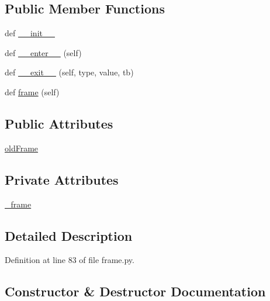 \subsection*{Public Member Functions}
\begin{DoxyCompactItemize}
\item 
def \hyperlink{classmemoryoracle_1_1frame_1_1Selector_a4321284dd9eaf92a17e1cab0b05031aa}{\+\_\+\+\_\+init\+\_\+\+\_\+}
\item 
def \hyperlink{classmemoryoracle_1_1frame_1_1Selector_a2e56e422890aedf9c85b592874357d42}{\+\_\+\+\_\+enter\+\_\+\+\_\+} (self)
\item 
def \hyperlink{classmemoryoracle_1_1frame_1_1Selector_a0c81c3a542276af51c56f0a56b2fee2c}{\+\_\+\+\_\+exit\+\_\+\+\_\+} (self, type, value, tb)
\item 
def \hyperlink{classmemoryoracle_1_1frame_1_1Selector_a40e2c431561865326cc4ff42e6d8293a}{frame} (self)
\end{DoxyCompactItemize}
\subsection*{Public Attributes}
\begin{DoxyCompactItemize}
\item 
\hyperlink{classmemoryoracle_1_1frame_1_1Selector_af45ac2d7b1133a45dfa21f83f1c5a1bc}{old\+Frame}
\end{DoxyCompactItemize}
\subsection*{Private Attributes}
\begin{DoxyCompactItemize}
\item 
\hyperlink{classmemoryoracle_1_1frame_1_1Selector_a93ce2fc7f2ba34cac7d5d481dcf548a5}{\+\_\+frame}
\end{DoxyCompactItemize}


\subsection{Detailed Description}


Definition at line 83 of file frame.\+py.



\subsection{Constructor \& Destructor Documentation}
\hypertarget{classmemoryoracle_1_1frame_1_1Selector_a4321284dd9eaf92a17e1cab0b05031aa}{}

